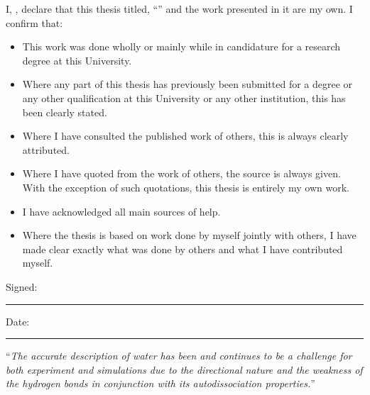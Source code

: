 \documentclass[
11pt, %
english, %
singlespacing, %
headsepline, %
]{MastersDoctoralThesis} %
\begin{document}

\begin{declaration}
\addchaptertocentry{\authorshipname} %
\noindent I, \authorname, declare that this thesis titled, \enquote{\ttitle} and the work presented in it are my own. I confirm that:

\begin{itemize} 
\item This work was done wholly or mainly while in candidature for a research degree at this University.
\item Where any part of this thesis has previously been submitted for a degree or any other qualification at this University or any other institution, this has been clearly stated.
\item Where I have consulted the published work of others, this is always clearly attributed.
\item Where I have quoted from the work of others, the source is always given. With the exception of such quotations, this thesis is entirely my own work.
\item I have acknowledged all main sources of help.
\item Where the thesis is based on work done by myself jointly with others, I have made clear exactly what was done by others and what I have contributed myself.\\
\end{itemize}
 
\noindent Signed:\\
\rule[0.5em]{25em}{0.5pt} %
 
\noindent Date:\\
\rule[0.5em]{25em}{0.5pt} %
\end{declaration}

\cleardoublepage


\vspace*{0.2\textheight}

\noindent\enquote{\itshape The accurate description of water has been and continues to be a challenge for both
experiment and simulations due to the directional nature and the weakness of the hydrogen bonds in conjunction 
with its autodissociation properties.}\bigbreak
\end{document}
